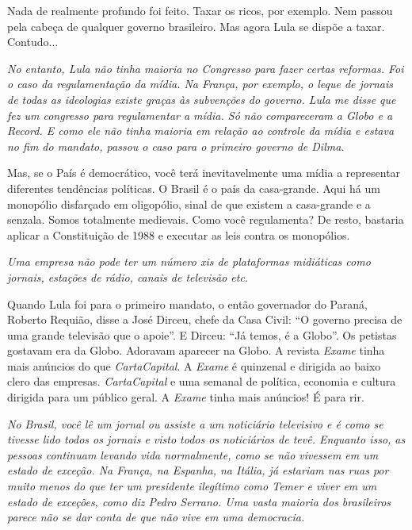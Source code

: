 \normalfont
Nada de realmente profundo foi feito. Taxar os ricos, por
exemplo. Nem passou pela cabeça de qualquer governo brasileiro. Mas
agora Lula se dispõe a taxar. Contudo...

\itshape
 No entanto, Lula não tinha maioria no Congresso para
fazer certas reformas. Foi o caso da regulamentação da mídia. Na França,
por exemplo, o leque de jornais de todas as ideologias existe graças às
subvenções do governo. Lula me disse que fez um congresso para
regulamentar a mídia. Só não compareceram a Globo e a Record. E como ele
não tinha maioria em relação ao controle da mídia e estava no fim do
mandato, passou o caso para o primeiro governo de Dilma.

\normalfont
Mas, se o País é democrático, você terá inevitavelmente
uma mídia a representar diferentes tendências políticas. O Brasil é o
país da casa-grande. Aqui há um monopólio disfarçado em oligopólio,
sinal de que existem a casa-grande e a senzala. Somos totalmente
medievais. Como você regulamenta? De resto, bastaria aplicar a
Constituição de 1988 e executar as leis contra os monopólios.

\itshape
 Uma empresa não pode ter um número xis de plataformas
midiáticas como jornais, estações de rádio, canais de televisão etc.

\normalfont
Quando Lula foi para o primeiro mandato, o então
governador do Paraná, Roberto Requião, disse a José Dirceu, chefe da
Casa Civil: ``O governo precisa de uma grande televisão que o apoie''. E
Dirceu: ``Já temos, é a Globo''. Os petistas gostavam era da Globo.
Adoravam aparecer na Globo. A revista \emph{Exame} tinha mais anúncios
do que \emph{CartaCapital}. A \emph{Exame} é quinzenal e dirigida ao
baixo clero das empresas. \emph{CartaCapital} e uma semanal de política,
economia e cultura dirigida para um público geral. A \emph{Exame} tinha
mais anúncios! É para rir.

\itshape
 No Brasil, você lê um jornal ou assiste a um noticiário
televisivo e é como se tivesse lido todos os jornais e visto todos os
noticiários de tevê. Enquanto isso, as pessoas continuam levando vida
normalmente, como se não vivessem em um estado de exceção. Na França, na
Espanha, na Itália, já estariam nas ruas por muito menos do que ter um
presidente ilegítimo como Temer e viver em um estado de exceções, como
diz Pedro Serrano. Uma vasta maioria dos brasileiros parece não se dar
conta de que não vive em uma democracia.

